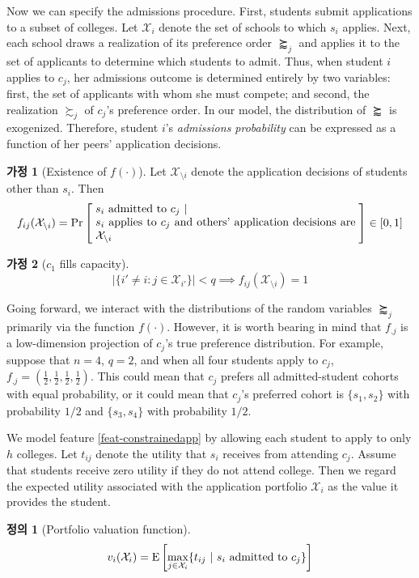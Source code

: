 \documentclass[12pt]{article} %
\theoremstyle{definition}
\newtheorem{definition}{Definition}
\newtheorem{assumption}{Assumption}
\theoremstyle{definition}
\newtheorem{definition}{정의}
\newtheorem{assumption}{가정}
\begin{document}
Now we can specify the admissions procedure. First, students submit applications to a subset of colleges. Let $\mathcal{X}_i$ denote the set of schools to which $s_i$ applies. Next, each school draws a realization of its preference order $\succapprox_j$ and applies it to the set of applicants to determine which students to admit. Thus, when student $i$ applies to $c_j$, her admissions outcome is determined entirely by two variables: first, the set of applicants with whom she must compete; and second, the realization $\succsim_j$ of $c_j$’s preference order. In our model, the distribution of $\succapprox$ is exogenized. Therefore, student $i$’s \emph{admissions probability} can be expressed as a function of her peers’ application decisions.
\begin{assumption}[Existence of $f(\cdot)$]
Let $\mathcal{X}_{\setminus i}$ denote the application decisions of students other than $s_i$. Then
\begin{equation}
f_{ij}(\mathcal{X}_{\setminus i}) = \operatorname{Pr}\left[\;\parbox{23em}{$s_i$ admitted to $c_j$~\textbar~\\$s_i$ applies to $c_j$ and others’ application decisions are $\mathcal{X}_{\setminus i}$}\;\right] \in [0, 1]
\end{equation}

\end{assumption}
\begin{assumption}[$c_1$ fills capacity] \label{c1fillcap}
\begin{equation}
|\{i' \neq i : j \in \mathcal{X}_{i'}\}| < q \implies f_{ij}(\mathcal{X}_{\setminus i}) = 1
\end{equation}
\end{assumption}
Going forward, we interact with the distributions of the random variables $\succapprox_j$ primarily via the function $f(\cdot)$. However, it is worth bearing in mind that $f_{.j}$ is a low-dimension projection of $c_j$'s true preference distribution. For example, suppose that $n=4$, $q=2$, and when all four students apply to $c_j$, $f_{.j} = (\tfrac{1}{2}, \tfrac{1}{2}, \tfrac{1}{2}, \tfrac{1}{2})$. This could mean that $c_j$ prefers all admitted-student cohorts with equal probability, or it could mean that $c_j$'s preferred cohort is $\{s_1, s_2\}$ with probability $1/2$ and $\{s_3, s_4\}$ with probability $1/2$. 

We model feature \ref{feat-constrainedapp} by allowing each student to apply to only $h$ colleges. Let $t_{ij}$ denote the utility that $s_i$ receives from attending $c_j$.  Assume that students receive zero utility if they do not attend college. Then we regard the expected utility associated with the application portfolio $\mathcal{X}_i$ as the value it provides the student.
\begin{definition}[Portfolio valuation function]
\begin{equation} \label{portfoliovaluationfn}%
v_i(\mathcal{X}_i) = \operatorname{E}\left[\max_{j \in \mathcal{X}_i }\{\text{$t_{ij}$~\textbar~$s_i$ admitted to $c_j$}\}\right]
\end{equation}
\end{definition}
\end{document}
